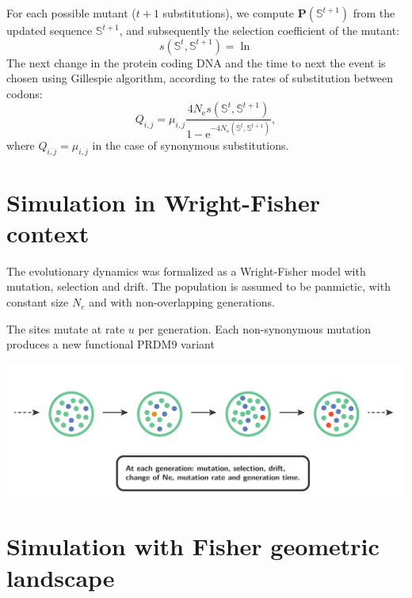 \documentclass{article}
\newcommand{\e}{\mathrm{e}}
\newcommand{\Ne}{N_{\mathrm{e}}}
\newcommand{\ci}{{i}}
\newcommand{\cj}{{j}}
\newcommand{\itoj}{\ci, \cj}
\newcommand{\submatrix}{Q}
\newcommand{\phenoGeo}{\bm{P}}
\begin{document}
For each possible mutant ($t+1$ substitutions), we compute $\phenoGeo\left(\mathbb{S}^{t+1}\right)$ from the updated sequence $\mathbb{S}^{t+1}$, and subsequently the selection coefficient of the mutant:
\begin{equation}
s \left( \mathbb{S}^{t},\mathbb{S}^{t+1}\right) = \ln 
\end{equation}
The next change in the protein coding DNA and the time to next the event is chosen using Gillespie algorithm, according to the rates of substitution between codons:
\begin{equation}
{\submatrix_{\itoj}} = \mu_{\itoj} \dfrac{4 \Ne s \left( \mathbb{S}^{t},\mathbb{S}^{t+1}\right)}{{1 - \e^{-4 \Ne \left( \mathbb{S}^{t},\mathbb{S}^{t+1}\right)} }}, 
\end{equation}
where ${\submatrix_{\itoj}} = \mu_{\itoj}$ in the case of synonymous substitutions.

\section{Simulation in Wright-Fisher context}

The evolutionary dynamics was formalized as a Wright-Fisher model with mutation, selection and drift. The population is assumed to be panmictic, with constant size $N_e$ and with non-overlapping generations. 

The sites mutate at rate $u$ per generation. Each non-synonymous mutation produces a new functional PRDM9 variant


\begin{center}
	\includegraphics[width=165mm] {artworks/ModelSimuPoly.pdf}
\end{center}

\section{Simulation with Fisher geometric landscape}
\end{document}
